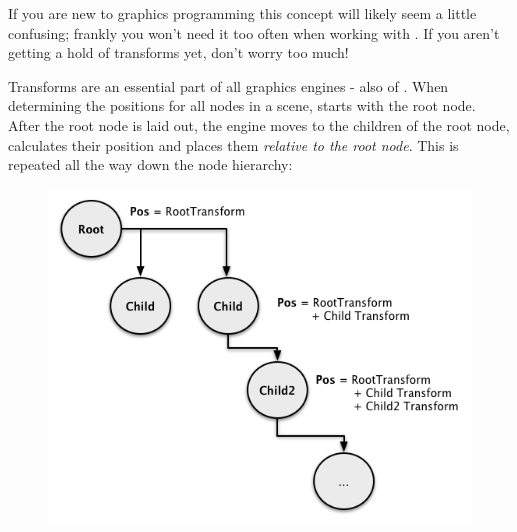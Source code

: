 If you are new to graphics programming this concept will likely seem a little
confusing; frankly you won't need it too often when working with \cocos{}. If
you aren't getting a hold of transforms yet, don't worry too much!

\begin{details}[frametitle={The role of transforms in graphics programming}]
Transforms are an essential part of all graphics engines - also of \cocos{}.
When determining the positions for all nodes in a scene, \cocos{} starts with
the root node. After the root node is laid out, the engine moves to the children
of the root node, calculates their position and places them \textit{relative to
the root node}. This is repeated all the way down the node hierarchy:
\begin{figure}[H]
		\centering
		\includegraphics[width=0.5\linewidth]{images/Chapter3/parent_transform_rendering.png}
\end{figure}
\end{details}

